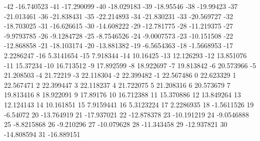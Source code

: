 -42                      -16.740523
-41                      -17.290099
-40                      -18.029183
-39                       -18.95546
-38                       -19.99423
-37                      -21.013461
-36                      -21.838431
-35                      -22.214893
-34                      -21.830231
-33                      -20.569727
-32                      -18.703025
-31                      -16.626615
-30                      -14.608222
-29                      -12.781775
-28                      -11.219375
-27                      -9.9793785
-26                      -9.1284728
-25                      -8.7546526
-24                      -9.0007573
-23                      -10.151508
-22                      -12.868858
-21                      -18.103174
-20                      -13.881382
-19                      -6.5654363
-18                      -1.5668953
-17                       2.2286247
-16                       5.3141654
-15                        7.918344
-14                        10.16425
-13                       12.126293
-12                       13.851076
-11                        15.37234
-10                       16.713512
-9                       17.892599
-8                       18.922697
-7                       19.813842
-6                       20.573966
-5                       21.208503
-4                        21.72219
-3                       22.118304
-2                       22.399482
-1                       22.567486
0                       22.623329
1                       22.567471
2                       22.399447
3                       22.118237
4                       21.722075
5                       21.208316
6                       20.573679
7                       19.813416
8                       18.922091
9                        17.89176
10                       16.712388
11                       15.370886
12                       13.849264
13                       12.124143
14                       10.161851
15                       7.9159441
16                       5.3123224
17                       2.2286935
18                      -1.5611526
19                        -6.54072
20                      -13.764919
21                      -17.937021
22                      -12.878378
23                      -10.191219
24                      -9.0546888
25                      -8.8215868
26                       -9.210296
27                      -10.079628
28                      -11.343458
29                      -12.937821
30                      -14.808594
31                      -16.889151
